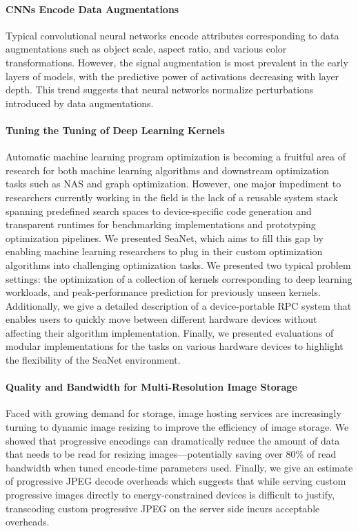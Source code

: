 \paragraph{CNNs Encode Data Augmentations}
Typical convolutional neural networks encode attributes corresponding to data augmentations such as object scale, aspect ratio, and various color transformations.
However, the signal augmentation is most prevalent in the early layers of models, with the predictive power of activations decreasing with layer depth.
This trend suggests that neural networks normalize perturbations introduced by data augmentations.

\paragraph{Tuning the Tuning of Deep Learning Kernels}
Automatic machine learning program optimization is becoming a fruitful area of research for both machine learning algorithms and downstream optimization tasks such as NAS and graph optimization.
However, one major impediment to researchers currently working in the field is the lack of a reusable system stack spanning predefined search spaces to device-specific code generation and transparent runtimes for benchmarking implementations and prototyping optimization pipelines.
We presented SeaNet, which aims to fill this gap by enabling machine learning researchers to plug in their custom optimization algorithms into challenging optimization tasks.
We presented two typical problem settings: the optimization of a collection of kernels corresponding to deep learning workloads, and peak-performance prediction for previously unseen kernels.
Additionally, we give a detailed description of a device-portable RPC system that enables users to quickly move between different hardware devices without affecting their algorithm implementation.
Finally, we presented evaluations of modular implementations for the tasks on various hardware devices to highlight the flexibility of the SeaNet environment.

\paragraph{Quality and Bandwidth for Multi-Resolution Image Storage}
Faced with growing demand for storage, image hosting services are increasingly turning to dynamic image resizing to improve the efficiency of image storage.
We showed that progressive encodings can dramatically reduce the amount of data that needs to be read for resizing images---potentially saving over 80\% of read bandwidth when tuned encode-time parameters used.
Finally, we give an estimate of progressive JPEG decode overheads which suggests that while serving custom progressive images directly to energy-constrained devices is difficult to justify, transcoding custom progressive JPEG on the server side incurs acceptable overheads.

